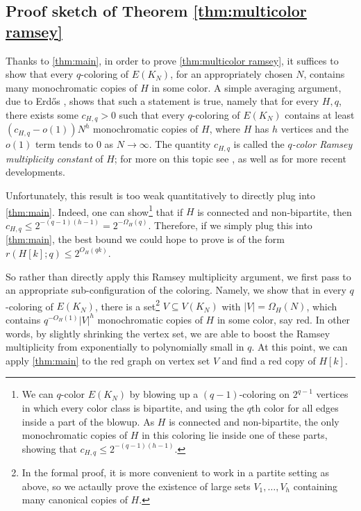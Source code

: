 \documentclass[11pt]{article}
\numberwithin{equation}{section}
\theoremstyle{plain}
\theoremstyle{remark}
\newcommand\ab[1]{\lvert #1 \rvert}
\begin{document}
\subsection{Proof sketch of Theorem \ref{thm:multicolor ramsey}}
Thanks to \cref{thm:main}, in order to prove \cref{thm:multicolor ramsey}, it suffices to show that every $q$-coloring of $E(K_N)$, for an appropriately chosen $N$, contains many monochromatic copies of $H$ in some color. 
A simple averaging argument, due to Erd\H os \cite{MR0151956}, shows that such a statement is true, namely that for every $H,q$, there exists some $c_{H,q}>0$ such that every $q$-coloring of $E(K_N)$ contains at least $(c_{H,q}-o(1))N^h$ monochromatic copies of $H$, where $H$ has $h$ vertices and the $o(1)$ term tends to $0$ as $N \to \infty$. The quantity $c_{H,q}$ is called the \emph{$q$-color Ramsey multiplicity constant} of $H$; for more on this topic see \cite[Section 2.6]{MR3497267}, as well as \cite{2206.05800,MR4618272,MR4426765} for more recent developments. 

Unfortunately, this result is too weak quantitatively to directly plug into \cref{thm:main}. Indeed, one can show\footnote{We can $q$-color $E(K_N)$ by blowing up a $(q-1)$-coloring on $2^{q-1}$ vertices in which every color class is bipartite, and using the $q$th color for all edges inside a part of the blowup. As $H$ is connected and non-bipartite, the only monochromatic copies of $H$ in this coloring lie inside one of these parts, showing that $c_{H,q} \leq 2^{-(q-1)(h-1)}$.} that 
if $H$ is connected and non-bipartite, then $c_{H,q} \leq 2^{-(q-1)(h-1)} =2^{-\Omega_H(q)}$. Therefore, if we simply plug this into \cref{thm:main}, the best bound we could hope to prove is of the form $r(H[k];q) \leq 2^{O_H(qk)}$.

So rather than directly apply this Ramsey multiplicity argument, we first pass to an appropriate sub-configuration of the coloring. Namely, we show that in every $q$-coloring of $E(K_N)$, there is a set\footnote{In the formal proof, it is more convenient to work in a partite setting as above, so we actaully prove the existence of large sets $V_1,\dots,V_h$ containing many canonical copies of $H$.} $V \subseteq V(K_N)$ with $\ab V = \Omega_H(N)$, which contains $q^{-O_H(1)} \ab V^h$ monochromatic copies of $H$ in some color, say red. In other words, by slightly shrinking the vertex set, we are able to boost the Ramsey multiplicity from exponentially to polynomially small in $q$. At this point, we can apply \cref{thm:main} to the red graph on vertex set $V$ and find a red copy of $H[k]$.
\end{document}
